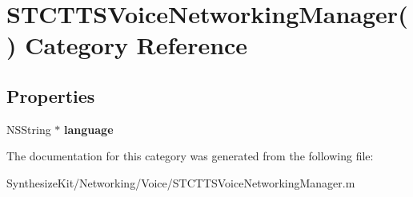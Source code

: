 \hypertarget{category_s_t_c_t_t_s_voice_networking_manager_07_08}{}\section{S\+T\+C\+T\+T\+S\+Voice\+Networking\+Manager() Category Reference}
\label{category_s_t_c_t_t_s_voice_networking_manager_07_08}
\subsection*{Properties}
\begin{DoxyCompactItemize}
\item 
\hypertarget{category_s_t_c_t_t_s_voice_networking_manager_07_08_a64e40e5b75d5632d80f37adfd06917c6}{}\label{category_s_t_c_t_t_s_voice_networking_manager_07_08_a64e40e5b75d5632d80f37adfd06917c6} 
N\+S\+String $\ast$ {\bfseries language}
\end{DoxyCompactItemize}


The documentation for this category was generated from the following file\+:\begin{DoxyCompactItemize}
\item 
Synthesize\+Kit/\+Networking/\+Voice/S\+T\+C\+T\+T\+S\+Voice\+Networking\+Manager.\+m\end{DoxyCompactItemize}
